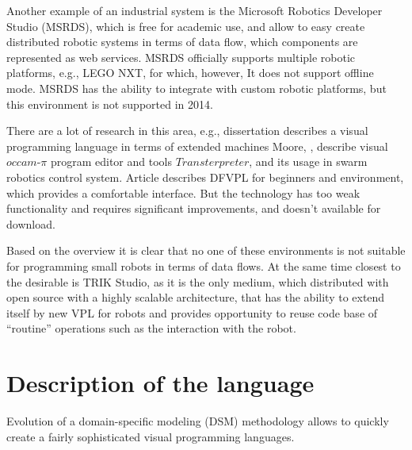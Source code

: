 \documentclass[conference,compsoc]{IEEEtran}
\begin{document}
Another example of an industrial system is the Microsoft Robotics Developer Studio (MSRDS)\cite{jackson2007microsoft}, which is free for academic use, and allow to easy create distributed robotic systems in terms of data flow, which components are represented as web services. MSRDS officially supports multiple robotic platforms, e.g., LEGO NXT\cite{kim2007programming}, for which, however, It does not support offline mode. MSRDS has the ability to integrate with  custom robotic platforms, but this environment is not supported in 2014.

There are a lot of research in this area, e.g., dissertation\cite{banyasad2000visual} describes a visual programming language in terms of extended machines Moore, \cite{simpson2008visual},\cite{posso2011process} describe visual $occam\mbox{-}\pi$ program editor and tools $Transterpreter$, and its usage in swarm robotics control system. Article\cite{diprose2011ruru} describes DFVPL for beginners and environment, which provides a comfortable interface. But the technology has too weak functionality and requires significant improvements, and doesn't available for download.

Based on the overview it is clear that no one of these environments is not suitable for programming small robots in terms of data flows. At the same time closest to the desirable is TRIK Studio, as it is the only medium, which distributed with open source with a highly scalable architecture, that has the ability to extend itself by new VPL for robots and provides opportunity to reuse code base of ``routine'' operations such as the interaction with the robot.


\section{Description of the language}
\label{sec:lang}
Evolution of a domain-specific modeling (DSM) methodology allows to quickly create a fairly sophisticated visual programming languages\cite{DSM}.

\end{document}

